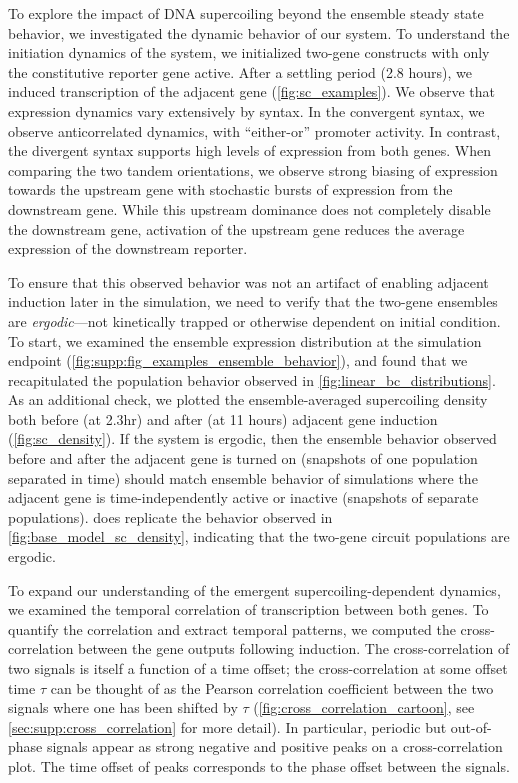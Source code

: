 \documentclass[11pt]{article} %
\begin{document}
To explore the impact of DNA supercoiling beyond the ensemble steady state behavior, we investigated the dynamic behavior of our system. To understand the initiation dynamics of the system, we initialized two-gene constructs with only the constitutive reporter gene active. After a settling period (2.8 hours), we induced transcription of the adjacent gene (\cref{fig:sc_examples}).
We observe that expression dynamics vary extensively by syntax. In the convergent syntax, we observe anticorrelated dynamics, with ``either-or'' promoter activity. In contrast, the divergent syntax supports high levels of expression from both genes. When comparing the two tandem orientations, we observe strong biasing of expression towards the upstream gene with stochastic bursts of expression from the downstream gene. While this upstream dominance does not completely disable the downstream gene, activation of the upstream gene reduces the average expression of the downstream reporter. 

To ensure that this observed behavior was not an artifact of enabling adjacent induction later in the simulation, we need to verify that the two-gene ensembles are \emph{ergodic}---not kinetically trapped or otherwise dependent on initial condition. To start, we examined the ensemble expression distribution at the simulation endpoint (\cref{fig:supp:fig_examples_ensemble_behavior}), and found that we recapitulated the population behavior observed in \cref{fig:linear_bc_distributions}. As an additional check, we plotted the ensemble-averaged supercoiling density both before (at 2.3hr) and after (at 11 hours) adjacent gene induction (\cref{fig:sc_density}). If the system is ergodic, then the ensemble behavior observed before and after the adjacent gene is turned on (snapshots of one population separated in time) should match ensemble behavior of simulations where the adjacent gene is time-independently active or inactive (snapshots of separate populations).  does replicate the behavior observed in \cref{fig:base_model_sc_density}, indicating that the two-gene circuit populations are ergodic.
 

To expand our understanding of the emergent supercoiling-dependent dynamics, we examined the temporal correlation of transcription between both genes. To quantify the correlation and extract temporal patterns, we computed the cross-correlation between the gene outputs following induction. The cross-correlation of two signals is itself a function of a time offset; the cross-correlation at some offset time \(\tau\) can be thought of as the Pearson correlation coefficient between the two signals where one has been shifted by \(\tau\) (\cref{fig:cross_correlation_cartoon}, see \cref{sec:supp:cross_correlation} for more detail). In particular, periodic but out-of-phase signals appear as strong negative and positive peaks on a cross-correlation plot.  The time offset of peaks corresponds to the phase offset between the signals.
\end{document}
